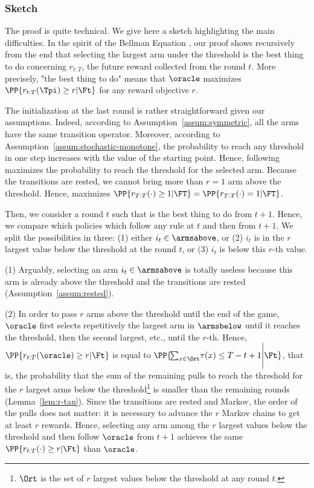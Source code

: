 \subsubsection{Sketch}
The proof is quite technical. We give here a sketch highlighting the main difficulties. In the spirit of the Bellman Equation \citep{bellman1966dynamic}, our proof shows recursively from the end that selecting the largest arm under the threshold is the best thing to do concerning $r_{t:T}$, the future reward collected from the round $t$. More precisely, "the best thing to do" means that $\oracle$ maximizes 
$\PP{r_{t:T}(\Tpi) \geq r| \Ft}$ for any reward objective $r$.

The initialization at the last round is rather straightforward given our assumptions. Indeed, according to Assumption~\ref{assum:symmetric}, all the arms have the same transition operator. Moreover, according to Assumption~\ref{assum:stochastic-monotone}, the probability to reach any threshold in one step increases with the value of the starting point.  Hence, following \FLUT maximizes the probability to reach the threshold for the selected arm. Because the transitions are rested, we cannot bring more than $r=1$ arm above the threshold. Hence, \FLUT maximizes $\PP{r_{T:T}(\cdot) \geq 1| \FT}= \PP{r_{T:T}(\cdot) = 1| \FT}$.

Then, we consider a round $t$ such that \FLUT is the best thing to do from $t+1$. Hence, we compare \FLUT which policies which follow any rule at $t$ and then \FLUT from $t+1$.  We split the possibilities in three: (1) either $i_t \in \armsabove$, or (2) $i_t$ is in the $r$ largest value below the threshold at the round $t$, or (3) $i_t$ is below this $r$-th value.

(1) Arguably, selecting an arm $i_t \in \armsabove$ is totally useless because this arm is already above the threshold and the transitions are rested (Assumption~\ref{assum:rested}). 

(2) In order to pass $r$ arms above the threshold until the end of the game, $\oracle$ first selects repetitively the largest arm in $\armsbelow$ until it reaches the threshold, then the second largest, etc., until the $r$-th.  Hence, $\PP{r_{t:T}(\oracle) \geq r| \Ft}$ is equal to $\PP{\!\sum_{x \in \Ort} \!\tau(x) \leq T - t + 1 \Bigg| \Ft}$, that is, the probability that the sum of the remaining pulls to reach the threshold for the $r$ largest arms below the threshold\footnote{$\Ort$ is the set of $r$ largest values below the threshold at any round $t$.} is smaller than the remaining rounds (Lemma~\ref{lem:r-tau}). Since the transitions are rested and Markov, the order of the pulls does not matter: it is necessary to advance the $r$ Markov chains to get at least $r$ rewards. Hence, selecting any arm among the $r$ largest values below the threshold and then follow $\oracle$ from $t+1$ achieves the same $\PP{r_{t:T}(\cdot) \geq r| \Ft}$ than $\oracle$.

